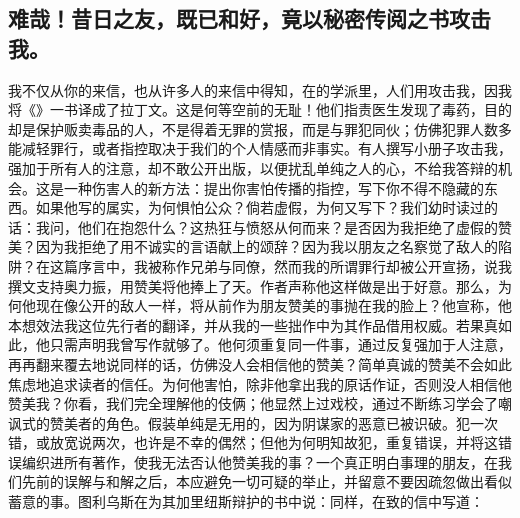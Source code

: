 \subsection{难哉！昔日之友，既已和好，竟以秘密传阅之书攻击我。}

我不仅从你的来信，也从许多人的来信中得知，在的学派里，人们用攻击我，因我将《》一书译成了拉丁文。这是何等空前的无耻！他们指责医生发现了毒药，目的却是保护贩卖毒品的人，不是得着无罪的赏报，而是与罪犯同伙；仿佛犯罪人数多能减轻罪行，或者指控取决于我们的个人情感而非事实。有人撰写小册子攻击我，强加于所有人的注意，却不敢公开出版，以便扰乱单纯之人的心，不给我答辩的机会。这是一种伤害人的新方法：提出你害怕传播的指控，写下你不得不隐藏的东西。如果他写的属实，为何惧怕公众？倘若虚假，为何又写下？我们幼时读过的话：我问，他们在抱怨什么？这热狂与愤怒从何而来？是否因为我拒绝了虚假的赞美？因为我拒绝了用不诚实的言语献上的颂辞？因为我以朋友之名察觉了敌人的陷阱？在这篇序言中，我被称作兄弟与同僚，然而我的所谓罪行却被公开宣扬，说我撰文支持奥力振，用赞美将他捧上了天。作者声称他这样做是出于好意。那么，为何他现在像公开的敌人一样，将从前作为朋友赞美的事抛在我的脸上？他宣称，他本想效法我这位先行者的翻译，并从我的一些拙作中为其作品借用权威。若果真如此，他只需声明我曾写作就够了。他何须重复同一件事，通过反复强加于人注意，再再翻来覆去地说同样的话，仿佛没人会相信他的赞美？简单真诚的赞美不会如此焦虑地追求读者的信任。为何他害怕，除非他拿出我的原话作证，否则没人相信他赞美我？你看，我们完全理解他的伎俩；他显然上过戏校，通过不断练习学会了嘲讽式的赞美者的角色。假装单纯是无用的，因为阴谋家的恶意已被识破。犯一次错，或放宽说两次，也许是不幸的偶然；但他为何明知故犯，重复错误，并将这错误编织进所有著作，使我无法否认他赞美我的事？一个真正明白事理的朋友，在我们先前的误解与和解之后，本应避免一切可疑的举止，并留意不要因疏忽做出看似蓄意的事。图利乌斯在为其加里纽斯辩护的书中说：同样，在致的信中写道：\par

\par


